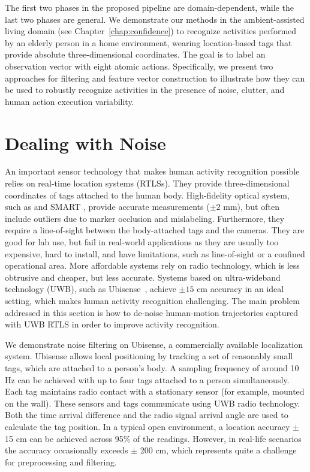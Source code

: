 The first two phases in the proposed pipeline are domain-dependent, while the last two phases are general. We demonstrate our methods in the ambient-assisted living domain (see Chapter~\ref{chap:confidence}) to recognize activities performed by an elderly person in a home environment, wearing location-based tags that provide absolute three-dimensional coordinates. The goal is to label an observation vector with eight atomic actions. Specifically, we present two approaches for filtering and feature vector construction to illustrate how they can be used to robustly recognize activities in the presence of noise, clutter, and human action execution variability.





\section{Dealing with Noise}
\label{sec:ar:noise}

An important sensor technology that makes human activity recognition possible relies on real-time location systems (RTLSs). They provide three-dimensional coordinates of tags attached to the human body. High-fidelity optical system, such as \cite{Vicon2009} and SMART \citep{SMART2009}, provide accurate measurements ($\pm 2$ mm), but often include outliers due to marker occlusion and mislabeling. Furthermore, they require a line-of-sight between the body-attached tags and the cameras. They are good for lab use, but fail in real-world applications as they are usually too expensive, hard to install, and have limitations, such as line-of-sight or a confined operational area. More affordable systems rely on radio technology, which is less obtrusive and cheaper, but less accurate. Systems based on ultra-wideband technology (UWB), such as Ubisense~\citep{Ubisense}, achieve $\pm 15$ cm accuracy in an ideal setting, which makes human activity recognition challenging. The main problem addressed in this section is how to de-noise human-motion trajectories captured with UWB RTLS in order to improve activity recognition.

We demonstrate noise filtering on Ubisense, a commercially available localization system. Ubisense allows local positioning by tracking a set of reasonably small tags, which are attached to a person's body. A sampling frequency of around 10 Hz can be achieved with up to four tags attached to a person simultaneously. Each tag maintains radio contact with a stationary sensor (for example, mounted on the wall). These sensors and tags communicate using UWB radio technology. Both the time arrival difference and the radio signal arrival angle are used to calculate the tag position. In a typical open environment, a location accuracy $\pm$15 cm can be achieved across 95\% of the readings. However, in real-life scenarios the accuracy occasionally exceeds $\pm$ 200 cm, which represents quite a challenge for preprocessing and filtering. 

